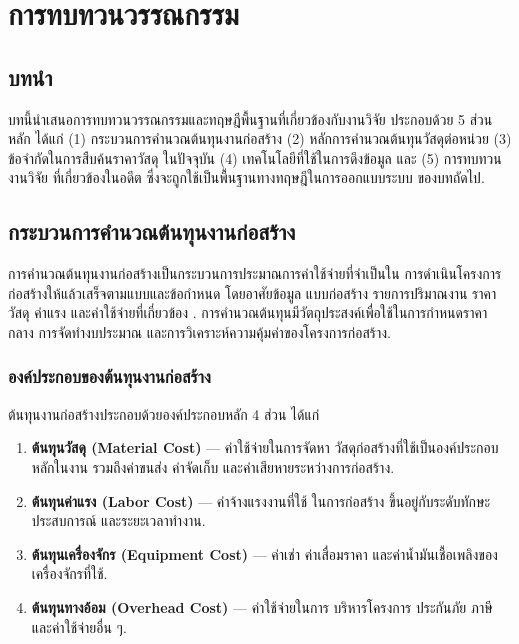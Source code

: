 \chapter{การทบทวนวรรณกรรม}
\label{ch:lit}

\section{บทนำ}

บทนี้นำเสนอการทบทวนวรรณกรรมและทฤษฎีพื้นฐานที่เกี่ยวข้องกับงานวิจัย
ประกอบด้วย 5 ส่วนหลัก ได้แก่ (1) กระบวนการคำนวณต้นทุนงานก่อสร้าง
(2) หลักการคำนวณต้นทุนวัสดุต่อหน่วย (3) ข้อจำกัดในการสืบค้นราคาวัสดุ
ในปัจจุบัน (4) เทคโนโลยีที่ใช้ในการดึงข้อมูล และ (5) การทบทวนงานวิจัย
ที่เกี่ยวข้องในอดีต ซึ่งจะถูกใช้เป็นพื้นฐานทางทฤษฎีในการออกแบบระบบ
ของบทถัดไป.

\section{กระบวนการคำนวณต้นทุนงานก่อสร้าง}
\label{sec:cost-process}

การคำนวณต้นทุนงานก่อสร้างเป็นกระบวนการประมาณการค่าใช้จ่ายที่จำเป็นใน
การดำเนินโครงการก่อสร้างให้แล้วเสร็จตามแบบและข้อกำหนด โดยอาศัยข้อมูล
แบบก่อสร้าง รายการปริมาณงาน ราคาวัสดุ ค่าแรง และค่าใช้จ่ายที่เกี่ยวข้อง
\cite{ashworth2013}. การคำนวณต้นทุนมีวัตถุประสงค์เพื่อใช้ในการกำหนดราคากลาง
การจัดทำงบประมาณ และการวิเคราะห์ความคุ้มค่าของโครงการก่อสร้าง.

\subsection{องค์ประกอบของต้นทุนงานก่อสร้าง}

ต้นทุนงานก่อสร้างประกอบด้วยองค์ประกอบหลัก 4 ส่วน ได้แก่

\begin{enumerate}[leftmargin=2em,itemsep=0.3em]
  \item \textbf{ต้นทุนวัสดุ (Material Cost)} --- ค่าใช้จ่ายในการจัดหา
        วัสดุก่อสร้างที่ใช้เป็นองค์ประกอบหลักในงาน รวมถึงค่าขนส่ง
        ค่าจัดเก็บ และค่าเสียหายระหว่างการก่อสร้าง.
  \item \textbf{ต้นทุนค่าแรง (Labor Cost)} --- ค่าจ้างแรงงานที่ใช้
        ในการก่อสร้าง ขึ้นอยู่กับระดับทักษะ ประสบการณ์ และระยะเวลาทำงาน.
  \item \textbf{ต้นทุนเครื่องจักร (Equipment Cost)} --- ค่าเช่า
        ค่าเสื่อมราคา และค่าน้ำมันเชื้อเพลิงของเครื่องจักรที่ใช้.
  \item \textbf{ต้นทุนทางอ้อม (Overhead Cost)} --- ค่าใช้จ่ายในการ
        บริหารโครงการ ประกันภัย ภาษี และค่าใช้จ่ายอื่น ๆ.
\end{enumerate}

